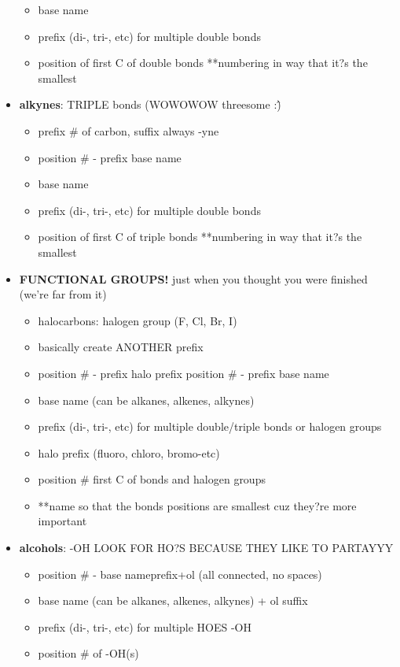 \documentclass[letterpaper, 12pt]{article}
\begin{document}
\begin{itemize}
\begin{itemize}
			\item base name
			\item prefix (di-, tri-, etc) for multiple double bonds
			\item position of first C of double bonds **numbering in way that it?s the smallest
		\end{itemize}
		\item \textbf{alkynes}: TRIPLE bonds (WOWOWOW threesome :\^)
		\begin{itemize}
			\item prefix \# of carbon, suffix always -yne
			\item position \# - prefix base name
			\item base name
			\item prefix (di-, tri-, etc) for multiple double bonds
			\item position of first C of triple bonds **numbering in way that it?s the smallest
		\end{itemize}
		\item \textbf{FUNCTIONAL GROUPS!} just when you thought you were finished (we're far from it)
		\begin{itemize}
			\item halocarbons: halogen group (F, Cl, Br, I)
			\item basically create ANOTHER prefix
			\item position \# - prefix halo prefix position \# - prefix base name
			\item base name (can be alkanes, alkenes, alkynes)
			\item prefix (di-, tri-, etc) for multiple double/triple bonds or halogen groups
			\item halo prefix (fluoro, chloro, bromo-etc)
			\item position \# first C of bonds and halogen groups 
			\item **name so that the bonds positions are smallest cuz they?re more important
		\end{itemize}
		\item \textbf{alcohols}: -OH LOOK FOR HO?S BECAUSE THEY LIKE TO PARTAYYY
		\begin{itemize}
			\item position \# -  base nameprefix+ol (all connected, no spaces)
			\item base name (can be alkanes, alkenes, alkynes) + ol suffix 
			\item prefix (di-, tri-, etc) for multiple HOES -OH
			\item position \# of -OH(s)

\end{itemize}
\end{itemize}
\end{document}
